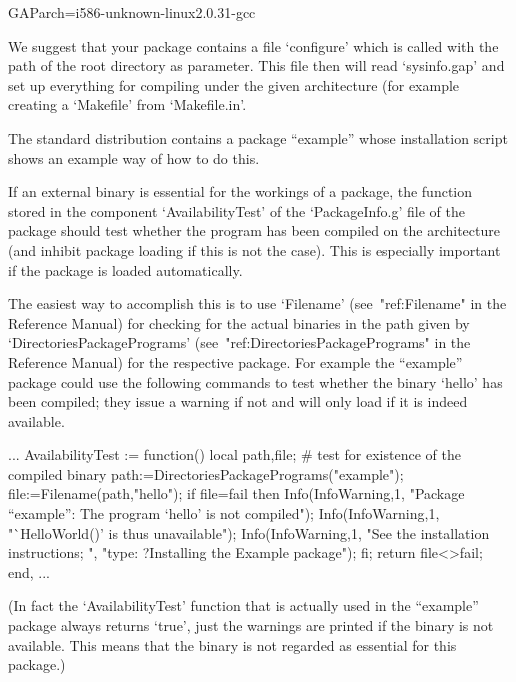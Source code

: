 \begintt
GAParch=i586-unknown-linux2.0.31-gcc
\endtt

We suggest that your {\GAP} package contains a file `configure' which
is  called with the  path of  the  {\GAP} root directory  as
parameter. This file then  will  read `sysinfo.gap' and set  up
everything for compiling under the given architecture (for example
creating a `Makefile' from `Makefile.in'.

The standard {\GAP} distribution contains a {\GAP} package ``example''
whose installation script shows an example way of how to do this.



If an external binary is essential for the  workings of a {\GAP} package,
the function stored in the component `AvailabilityTest' of the
`PackageInfo.g' file of the package should test whether the program
has been compiled on the architecture (and inhibit package loading
if this is not the case).
This is especially important if the package is loaded automatically.

The easiest way to accomplish this is to use `Filename'
(see~"ref:Filename" in the {\GAP} Reference Manual) for checking for the
actual binaries in the path given by `DirectoriesPackagePrograms'
(see~"ref:DirectoriesPackagePrograms" in the {\GAP} Reference Manual)
for the respective package.
For example the ``example'' {\GAP} package could use the following commands
to test whether the binary `hello' has been compiled;
they issue a warning if not and will only load if it is indeed available.

\begintt
...
AvailabilityTest := function()
  local path,file;
    # test for existence of the compiled binary
    path:=DirectoriesPackagePrograms("example");
    file:=Filename(path,"hello");
    if file=fail then
      Info(InfoWarning,1,
        "Package ``example'': The program `hello' is not compiled");
      Info(InfoWarning,1,
        "`HelloWorld()' is thus unavailable");
      Info(InfoWarning,1,
        "See the installation instructions; ",
        "type: ?Installing the Example package");
    fi;
    return file<>fail;
  end,
...
\endtt

(In fact the `AvailabilityTest' function that is actually used
in the ``example'' package always returns `true',
just the warnings are printed if the binary is not available.
This means that the binary is not regarded as essential for this
package.)

